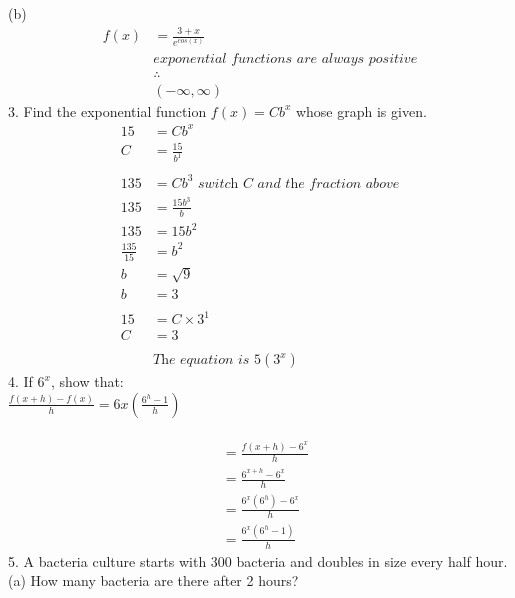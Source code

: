 \documentclass{article}
\begin{document}
\\\\
(b)\\
\begin{equation}
\begin{split}
    f(x) & = \frac{3+x}{e^{cos(x)}}\\
    & \textit{exponential functions are always positive}\\
    & \therefore\\
    & (-\infty, \infty)     
\end{split}
\end{equation}
3. Find the exponential function $f(x) = Cb^x$ whose graph is given.\\
\begin{equation}
\begin{split}
    15 & = Cb^x \\
    C & = \frac{15}{b^1}\\\\
    135 & = Cb^3 \textit{ switch C and the fraction above}\\
    135 & = \frac{15b^3}{b}\\
    135 & = 15b^2\\
    \frac{135}{15} & = b^2\\
    b & = \sqrt{9}\\
    b & = 3\\\\
    15 & = C\times3^1\\
    C & = 3\\\\
    &\textit{The equation is $5(3^x)$}
\end{split}
\end{equation}
4. If $6^x$, show that:\\
$\frac{f(x+h) - f(x)}{h} = 6x(\frac{6^h-1}{h})$\\\\
\begin{equation}
\begin{split}
    & = \frac{f(x+h) - 6^x}{h}\\
    & = \frac{6^{x+h}-6^x}{h}\\
    & = \frac{6^x(6^h)-6^x}{h}\\
    & = \frac{6^x(6^h - 1)}{h}     
\end{split}
\end{equation}
5. A bacteria culture starts with 300 bacteria and doubles in size every half hour.\\
(a) How many bacteria are there after 2 hours?\\
\end{document}
